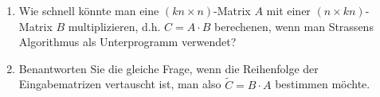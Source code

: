 
\begin{exercise}

\phantom{}

\begin{enumerate}[label = (\alph*)]
  \item Wie schnell könnte man eine $(kn \times n)$-Matrix $A$ mit einer $(n \times kn)$-Matrix $B$ multiplizieren, d.h. $C = A \cdot B$ berechenen, wenn man Strassens Algorithmus als Unterprogramm verwendet?
  \item Benantworten Sie die gleiche Frage, wenn die Reihenfolge der Eingabematrizen vertauscht ist, man also $\tilde{C} = B \cdot A$ bestimmen möchte.
\end{enumerate}

\end{exercise}



